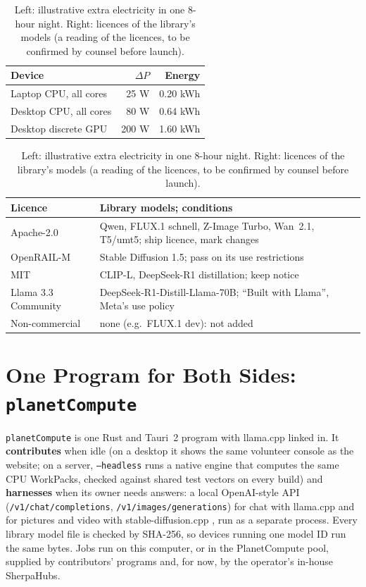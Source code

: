 \documentclass[11pt,a4paper]{article}
\theoremstyle{definition}
\theoremstyle{plain}
\begin{document}
\begin{table}[ht]
\centering
\caption{Left: illustrative extra electricity in one 8-hour night. Right: licences of the library's models (a
reading of the licences, to be confirmed by counsel before launch).}\label{tab:econ}
\small
\begin{tabular}[t]{@{}lrr@{}}
\toprule
\textbf{Device} & $\Delta P$ & \textbf{Energy} \\
\midrule
Laptop CPU, all cores & 25 W & 0.20 kWh \\
Desktop CPU, all cores & 80 W & 0.64 kWh \\
Desktop discrete GPU & 200 W & 1.60 kWh \\
\bottomrule
\end{tabular}\hfill
\begin{tabular}[t]{@{}>{\raggedright\arraybackslash}p{2.0cm}>{\raggedright\arraybackslash}p{5.6cm}@{}}
\toprule
\textbf{Licence} & \textbf{Library models; conditions} \\
\midrule
Apache-2.0 & Qwen, FLUX.1 schnell, Z-Image Turbo, Wan~2.1, T5/umt5; ship licence, mark changes \\
OpenRAIL-M & Stable Diffusion 1.5; pass on its use restrictions \\
MIT & CLIP-L, DeepSeek-R1 distillation; keep notice \\
Llama 3.3 Community & DeepSeek-R1-Distill-Llama-70B; ``Built with Llama'', Meta's use policy \\
Non-commercial & none (e.g.\ FLUX.1 dev): not added \\
\bottomrule
\end{tabular}
\end{table}

\section{One Program for Both Sides: \texttt{planetCompute}}\label{sec:client}

\texttt{planetCompute} is one Rust and Tauri~2 \citep{tauri2} program with llama.cpp \citep{llamacpp} linked in. It
\textbf{contributes} when idle (on a desktop it shows the same volunteer console as the website; on a server,
\texttt{--headless} runs a native engine that computes the same CPU WorkPacks, checked against shared test
vectors on every build) and \textbf{harnesses} when its owner needs answers: a local OpenAI-style API
(\texttt{/v1/chat/completions}, \texttt{/v1/images/generations}) for chat with llama.cpp and for pictures and
video with stable-diffusion.cpp \citep{sdcpp}, run as a separate process. Every library model file is checked by SHA-256, so devices running one model ID run the same bytes. Jobs run on this computer, or in the PlanetCompute pool,
supplied by contributors' programs and, for now, by the operator's in-house SherpaHubs.
\end{document}
